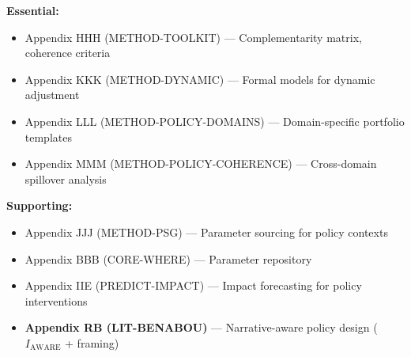 
\begin{tcolorbox}[colback=yellow!10!white, colframe=orange!75!black, title=Appendix References]

\textbf{Essential:}
\begin{itemize}[nosep]
\item Appendix HHH (METHOD-TOOLKIT) --- Complementarity matrix, coherence criteria
\item Appendix KKK (METHOD-DYNAMIC) --- Formal models for dynamic adjustment
\item Appendix LLL (METHOD-POLICY-DOMAINS) --- Domain-specific portfolio templates
\item Appendix MMM (METHOD-POLICY-COHERENCE) --- Cross-domain spillover analysis
\end{itemize}

\textbf{Supporting:}
\begin{itemize}[nosep]
\item Appendix JJJ (METHOD-PSG) --- Parameter sourcing for policy contexts
\item Appendix BBB (CORE-WHERE) --- Parameter repository
\item Appendix IIE (PREDICT-IMPACT) --- Impact forecasting for policy interventions
\item \textbf{Appendix RB (LIT-BENABOU)} --- Narrative-aware policy design ($I_{\text{AWARE}}$ + framing)
\end{itemize}

\end{tcolorbox}

